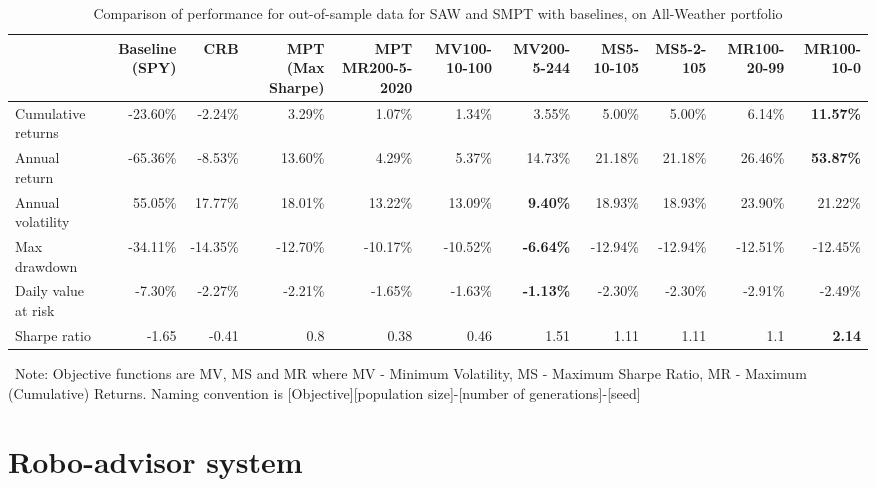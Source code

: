\documentclass{article}
\begin{document}
\begin{table}[htbp]
  \centering
  \caption{Comparison  of  performance for out-of-sample data for SAW and SMPT with baselines, on All-Weather portfolio}
    \begin{tabular}{|p{4em}|r|r|r|r|r|r|r|r|r|r|}
    \toprule
    \multicolumn{1}{|l|}{} & \multicolumn{1}{p{3.2em}|}{\cellcolor[rgb]{ .906,  .902,  .902}Baseline (SPY)} & \multicolumn{1}{p{3.2em}|}{\cellcolor[rgb]{ .906,  .902,  .902}CRB} & \multicolumn{1}{p{3.2em}|}{\cellcolor[rgb]{ .906,  .902,  .902}MPT (Max Sharpe)} & \multicolumn{1}{p{3.2em}|}{MPT MR200-5-2020} & \multicolumn{1}{p{3.2em}|}{MV100-10-100} & \multicolumn{1}{p{3.2em}|}{\textbf{MV200-5-244}} & \multicolumn{1}{p{3.2em}|}{MS5-10-105} & \multicolumn{1}{p{3.2em}|}{MS5-2-105} & \multicolumn{1}{p{3.2em}|}{MR100-20-99} & \multicolumn{1}{p{3.2em}|}{\textbf{MR100-10-0}} \\
    \midrule
    Cumulative returns & -23.60\% & -2.24\% & 3.29\% & 1.07\% & 1.34\% & 3.55\% & 5.00\% & 5.00\% & 6.14\% & \textbf{11.57\%} \\
    \midrule
    Annual return & -65.36\% & -8.53\% & 13.60\% & 4.29\% & 5.37\% & 14.73\% & 21.18\% & 21.18\% & 26.46\% & \textbf{53.87\%} \\
    \midrule
    Annual volatility & 55.05\% & 17.77\% & 18.01\% & 13.22\% & 13.09\% & \textbf{9.40\%} & 18.93\% & 18.93\% & 23.90\% & 21.22\% \\
    \midrule
    Max drawdown & -34.11\% & -14.35\% & -12.70\% & -10.17\% & -10.52\% & \textbf{-6.64\%} & -12.94\% & -12.94\% & -12.51\% & -12.45\% \\
    \midrule
    Daily value at risk & -7.30\% & -2.27\% & -2.21\% & -1.65\% & -1.63\% & \textbf{-1.13\%} & -2.30\% & -2.30\% & -2.91\% & -2.49\% \\
    \midrule
    Sharpe ratio & -1.65 & -0.41 & 0.8   & 0.38  & 0.46  & 1.51  & 1.11  & 1.11  & 1.1   & \textbf{2.14} \\
    \bottomrule
    \end{tabular}%

  \label{tab:saw_smpt}%
  \
  Note: Objective functions are MV, MS and MR where MV - Minimum Volatility, MS - Maximum Sharpe Ratio, MR - Maximum (Cumulative) Returns. Naming convention is [Objective][population size]-[number of generations]-[seed]
\end{table}%

\section{Robo-advisor system}
\label{sec:robo}
\end{document}
